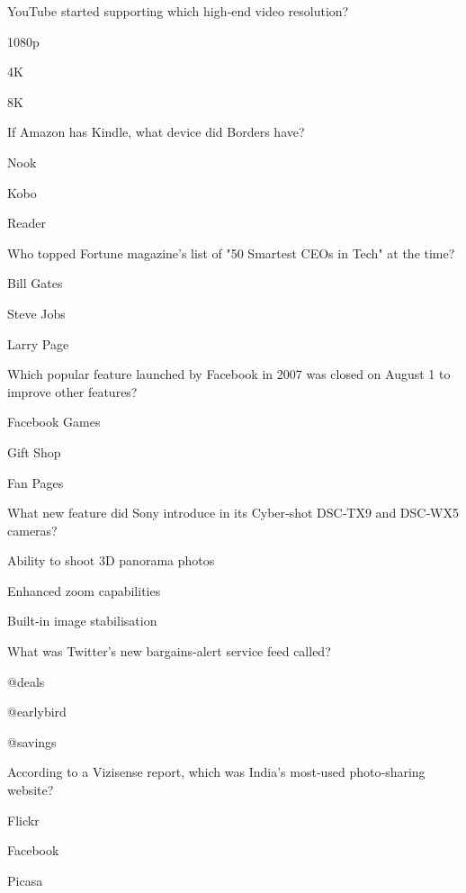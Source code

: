 
\begin{enhancedmcq}{YouTube started supporting which high‑end video resolution?}
\item 1080p
\item 4K
\item 8K

\end{enhancedmcq}
\begin{enhancedmcq}{If Amazon has Kindle, what device did Borders have?}
\item Nook
\item Kobo
\item Reader

\end{enhancedmcq}
\begin{enhancedmcq}{Who topped Fortune magazine's list of "50 Smartest CEOs in Tech" at the time?}
\item Bill Gates
\item Steve Jobs
\item Larry Page

\end{enhancedmcq}
\begin{enhancedmcq}{Which popular feature launched by Facebook in 2007 was closed on August 1 to improve other features?}
\item Facebook Games
\item Gift Shop
\item Fan Pages

\end{enhancedmcq}
\begin{enhancedmcq}{What new feature did Sony introduce in its Cyber‑shot DSC‑TX9 and DSC‑WX5 cameras?}
\item Ability to shoot 3D panorama photos
\item Enhanced zoom capabilities
\item Built‑in image stabilisation

\end{enhancedmcq}
\begin{enhancedmcq}{What was Twitter's new bargains‑alert service feed called?}
\item @deals
\item @earlybird
\item @savings

\end{enhancedmcq}
\begin{enhancedmcq}{According to a Vizisense report, which was India's most‑used photo‑sharing website?}
\item Flickr
\item Facebook
\item Picasa

\end{enhancedmcq}
